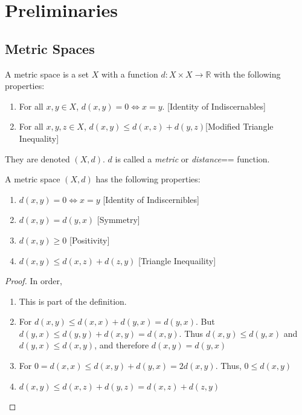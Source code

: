 \documentclass[crop=false,class=article,oneside]{standalone}
\begin{document}
    \ifx\ifworkmasterswork\undefined
        \section*{Preliminaries}
        \setcounter{section}{1}
    \fi
    \subsection{Metric Spaces}
        \begin{definition}
        A metric space is a set $X$ with a function $d:X\times X\rightarrow \mathbb{R}$ with the following properties:
        \begin{enumerate}
        \item For all $x,y\in X$, $d(x,y) = 0\Leftrightarrow x=y$. \hfill [Identity of Indiscernables]
        \item For all $x,y,z\in X$, $d(x,y) \leq d(x,z)+d(y,z)$\hfill [Modified Triangle Inequality]
        \end{enumerate}
        They are denoted $(X,d)$. $d$ is called a
        \textit{metric} or \textit{distance}== function.
        \end{definition}
        \begin{theorem}
        A metric space $(X,d)$ has the following properties:
        \begin{enumerate}
            \item $d(x,y) = 0 \Leftrightarrow x=y$ \hfill [Identity of Indiscernibles]
            \item $d(x,y) = d(y,x)$ \hfill [Symmetry]
            \item $d(x,y) \geq 0$ \hfill [Positivity]
            \item $d(x,y) \leq d(x,z)+d(z,y)$ \hfill [Triangle Inequaility]
        \end{enumerate}
        \end{theorem}
        \begin{proof}
        In order,
        \begin{enumerate}
            \item This is part of the definition.
            \item For $d(x,y) \leq d(x,x)+d(y,x) = d(y,x)$. But $d(y,x) \leq d(y,y)+d(x,y) = d(x,y)$. Thus $d(x,y)\leq d(y,x)$ and $d(y,x) \leq d(x,y)$, and therefore $d(x,y) = d(y,x)$
            \item For $0=d(x,x) \leq d(x,y)+d(y,x) = 2d(x,y)$. Thus, $0\leq d(x,y)$
            \item $d(x,y)\leq d(x,z)+d(y,z) = d(x,z)+d(z,y)$
        \end{enumerate}
        \end{proof}
\end{document}
